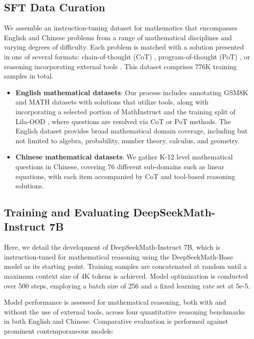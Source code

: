 \subsection{SFT Data Curation}

We assemble an instruction-tuning dataset for mathematics that encompasses English and Chinese problems from a range of mathematical disciplines and varying degrees of difficulty. Each problem is matched with a solution presented in one of several formats: chain-of-thought (CoT) \citep{cot}, program-of-thought (PoT) \citep{pot,pal}, or reasoning incorporating external tools \citep{tora}. This dataset comprises 776K training samples in total.

\begin{itemize}[topsep=0pt]
    \item \textbf{English mathematical datasets}: Our process includes annotating GSM8K and MATH datasets with solutions that utilize tools, along with incorporating a selected portion of MathInstruct \citep{MathInstruct} and the training split of Lila-OOD \citep{lila}, where questions are resolved via CoT or PoT methods. The English dataset provides broad mathematical domain coverage, including but not limited to algebra, probability, number theory, calculus, and geometry.
    \item \textbf{Chinese mathematical datasets}: We gather K-12 level mathematical questions in Chinese, covering 76 different sub-domains such as linear equations, with each item accompanied by CoT and tool-based reasoning solutions.
\end{itemize}

\subsection{Training and Evaluating DeepSeekMath-Instruct 7B}

Here, we detail the development of DeepSeekMath-Instruct 7B, which is instruction-tuned for mathematical reasoning using the DeepSeekMath-Base model as its starting point. Training samples are concatenated at random until a maximum context size of 4K tokens is achieved. Model optimization is conducted over 500 steps, employing a batch size of 256 and a fixed learning rate set at 5e-5.

Model performance is assessed for mathematical reasoning, both with and without the use of external tools, across four quantitative reasoning benchmarks in both English and Chinese. Comparative evaluation is performed against prominent contemporaneous models:

